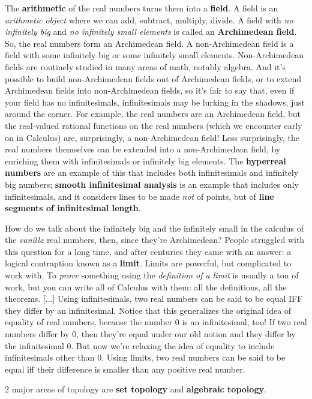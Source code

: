 The {\bf arithmetic} of the real numbers turns them into a {\bf field}. A field is an {\it arithmetic object} where we can add, subtract, multiply, divide. A field with {\it no infinitely big} and {\it no infinitely small elements} is called an {\bf Archimedean field}. So, the real numbers form an Archimedean field. A non-Archimedean field is a field with some infinitely big or some infinitely small elements. Non-Archimedean fields are routinely studied in many areas of math, notably algebra. And it's possible to build non-Archimedean fields out of Archimedean fields, or to extend Archimedean fields into non-Archimedean fields, so it's fair to say that, even if your field has no infinitesimals, infinitesimals may be lurking in the shadows, just around the corner. For example, the real numbers are an Archimedean field, but the real-valued rational functions on the real numbers (which we encounter early on in Calculus) are, surprisingly, a non-Archimedean field! Less surprisingly, the real numbers themselves can be extended into a non-Archimedean field, by enriching them with infinitesimals or infinitely big elements. The {\bf hyperreal numbers} are an example of this that includes both infinitesimals and infinitely big numbers; {\bf smooth infinitesimal analysis} is an example that includes only infinitesimals, and it considers lines to be made {\it not} of points, but of {\bf line segments of infinitesimal length}.

How do we talk about the infinitely big and the infinitely small in the calculus of the {\it vanilla} real numbers, then, since they're Archimedean? People struggled with this question for a long time, and after centuries they came with an answer: a logical contraption known as a {\bf limit}. Limits are powerful, but complicated to work with. To {\it prove} something using the {\it definition of a limit} is usually a ton of work, but you can write all of Calculus with them: all the definitions, all the theorems. [...] Using infinitesimals, two real numbers can be said to be equal IFF they differ by an infinitesimal. Notice that this generalizes the original idea of equality of real numbers, because the number $0$ is an infinitesimal, too! If two real numbers differ by $0$, then they're equal under our old notion and they differ by the infinitesimal $0$. But now we're relaxing the idea of equality to include infinitesimals other than $0$. Using limits, two real numbers can be said to be equal iff their difference is smaller than any positive real number.

\vskip8pt
2 major areas of topology are {\bf set topology} and {\bf algebraic topology}.

